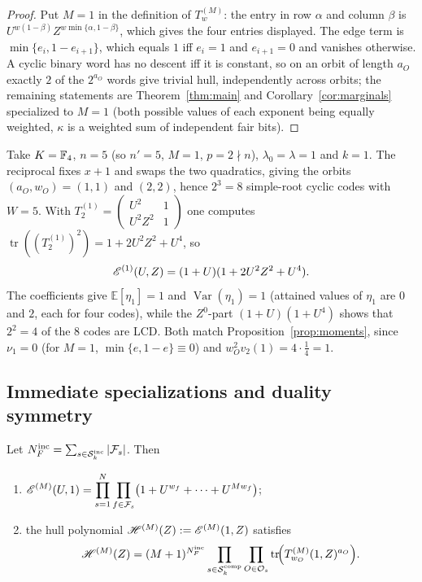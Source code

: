 \begin{proof}
Put $M=1$ in the definition of $T^{(M)}_w$: the entry in row $\alpha$ and
column $\beta$ is $U^{w(1-\beta)}Z^{w\min\{\alpha,1-\beta\}}$, which gives the
four entries displayed. The edge term is
$\min\{e_i,1-e_{i+1}\}$, which equals $1$ iff $e_i=1$ and $e_{i+1}=0$ and
vanishes otherwise. A cyclic binary word has no descent iff it is constant, so
on an orbit of length $a_O$ exactly $2$ of the $2^{a_O}$ words give trivial
hull, independently across orbits; the remaining statements are
Theorem~\ref{thm:main} and Corollary~\ref{cor:marginals} specialized to $M=1$
(both possible values of each exponent being equally weighted, $\kappa$ is a
weighted sum of independent fair bits).
\end{proof}

\begin{example}\label{ex:M1}
Take $K=\mathbb F_4$, $n=5$ (so $n'=5$, $M=1$, $p=2\nmid n$), $\lambda_0=\lambda=1$
and $k=1$. The reciprocal fixes $x+1$ and swaps the two quadratics, giving the
orbits $(a_O,w_O)=(1,1)$ and $(2,2)$, hence $2^3=8$ simple-root cyclic codes
with $W=5$. With
$T^{(1)}_2=\begin{pmatrix}U^2&1\\ U^2Z^2&1\end{pmatrix}$ one computes
$\operatorname{tr}((T^{(1)}_2)^2)=1+2U^2Z^2+U^4$, so
\[
\mathscr E^{(1)}(U,Z)=(1+U)(1+2U^2Z^2+U^4).
\]
The coefficients give $\mathbb{E}[\eta_1]=1$ and $\operatorname{Var}(\eta_1)=1$
(attained values of $\eta_1$ are $0$ and $2$, each for four codes), while the
$Z^0$-part $(1+U)(1+U^4)$ shows that $2^2=4$ of the $8$ codes are LCD. Both
match Proposition~\ref{prop:moments}, since $\nu_1=0$ (for $M=1$,
$\min\{e,1-e\}\equiv0$) and $w_O^2v_2(1)=4\cdot\tfrac14=1$.
\end{example}

\subsection{Immediate specializations and duality symmetry}
\label{sec:specialisations}

\begin{corollary}\label{cor:marginals}
Let $N_F^{\mathrm{inc}}=\sum_{s\in\mathcal{S}_k^{\mathrm{inc}}}|\mathcal F_s|$.  Then
\begin{enumerate}
\item[\textup{(i)}]
$\displaystyle
\mathscr E^{(M)}(U,1)
 =\prod_{s=1}^{N}\prod_{f\in\mathcal F_s}
   \bigl(1+U^{w_f}+\cdots+U^{Mw_f}\bigr)$;
\item[\textup{(ii)}] the hull polynomial
$\mathscr{H}^{(M)}(Z):=\mathscr E^{(M)}(1,Z)$ satisfies
\[
\mathscr{H}^{(M)}(Z)
 =(M+1)^{N_F^{\mathrm{inc}}}
  \prod_{s\in\mathcal{S}_k^{\mathrm{comp}}}\prod_{O\in\mathcal O_s}
   \operatorname{tr}\!\Bigl(T^{(M)}_{w_O}(1,Z)^{a_O}\Bigr).
\]
\end{enumerate}
\end{corollary}

